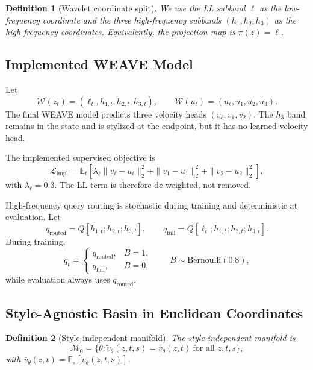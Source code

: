 \documentclass[10pt,letterpaper]{article}
\newtheorem*{sdefinition}{Definition}
\begin{document}
\begin{sdefinition}[Wavelet coordinate split]
We use the LL subband $\ell$ as the low-frequency coordinate and the three high-frequency subbands $(h_1,h_2,h_3)$ as the high-frequency coordinates. Equivalently, the projection map is $\pi(z)=\ell$.
\end{sdefinition}

\subsection{Implemented WEAVE Model}
\label{sec:implemented}

Let
\[
\mathcal W(z_t) = (\ell_t,h_{1,t},h_{2,t},h_{3,t}),
\qquad
\mathcal W(u_t) = (u_\ell,u_1,u_2,u_3).
\]
The final WEAVE model predicts three velocity heads $(v_\ell,v_1,v_2)$. The $h_3$ band remains in the state and is stylized at the endpoint, but it has no learned velocity head.

The implemented supervised objective is
\begin{equation}
\mathcal L_{\mathrm{impl}}
=
\mathbb E_t\!\left[
\lambda_\ell\|v_\ell-u_\ell\|_2^2
+
\|v_1-u_1\|_2^2
+
\|v_2-u_2\|_2^2
\right],
\label{eq:impl-loss}
\end{equation}
with $\lambda_\ell = 0.3$. The LL term is therefore de-weighted, not removed.

High-frequency query routing is stochastic during training and deterministic at evaluation. Let
\[
q_{\mathrm{routed}} = Q[h_{1,t};h_{2,t};h_{3,t}],
\qquad
q_{\mathrm{full}} = Q[\ell_t;h_{1,t};h_{2,t};h_{3,t}].
\]
During training,
\[
q_t =
\begin{cases}
q_{\mathrm{routed}}, & B=1,\\
q_{\mathrm{full}}, & B=0,
\end{cases}
\qquad
B \sim \mathrm{Bernoulli}(0.8),
\]
while evaluation always uses $q_{\mathrm{routed}}$.

\subsection{Style-Agnostic Basin in Euclidean Coordinates}
\label{sec:degeneration}

\begin{sdefinition}[Style-independent manifold]
The style-independent manifold is
\[
\mathcal M_0
=
\{\theta:\tilde v_\theta(z,t,s)=\bar v_\theta(z,t)\ \text{for all } z,t,s\},
\]
with $\bar v_\theta(z,t)=\mathbb E_s[\tilde v_\theta(z,t,s)]$.
\end{sdefinition}
\end{document}

